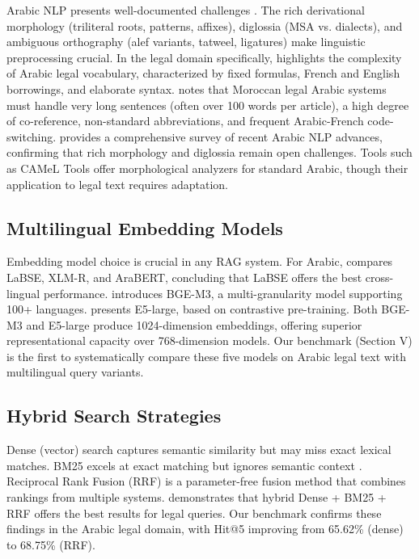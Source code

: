 Arabic NLP presents well-documented challenges \cite{habash2010arabic}.
The rich derivational morphology (triliteral roots, patterns, affixes),
diglossia (MSA vs. dialects), and ambiguous orthography (alef variants,
tatweel, ligatures) make linguistic preprocessing crucial. In the legal
domain specifically, \cite{zaghouani2021arabic} highlights the complexity
of Arabic legal vocabulary, characterized by fixed formulas, French and
English borrowings, and elaborate syntax. \cite{benali2025moroccan} notes
that Moroccan legal Arabic systems must handle very long sentences (often
over 100 words per article), a high degree of co-reference, non-standard
abbreviations, and frequent Arabic-French code-switching.
\cite{nassif2024arabic} provides a comprehensive survey of recent Arabic
NLP advances, confirming that rich morphology and diglossia remain open
challenges. Tools such as CAMeL Tools \cite{obaraj2021cameltools} offer
morphological analyzers for standard Arabic, though their application to
legal text requires adaptation.

\subsection{Multilingual Embedding Models}

Embedding model choice is crucial in any RAG system. For Arabic,
\cite{ali2022arabic} compares LaBSE, XLM-R, and AraBERT, concluding that
LaBSE offers the best cross-lingual performance. \cite{wang2023bge}
introduces BGE-M3, a multi-granularity model supporting 100+ languages.
\cite{liang2023multilingual} presents E5-large, based on contrastive
pre-training. Both BGE-M3 and E5-large produce 1024-dimension embeddings,
offering superior representational capacity over 768-dimension models.
Our benchmark (Section V) is the first to systematically compare these five
models on Arabic legal text with multilingual query variants.

\subsection{Hybrid Search Strategies}

Dense (vector) search captures semantic similarity but may miss exact lexical
matches. BM25 excels at exact matching but ignores semantic context
\cite{robertson2009bm25}. Reciprocal Rank Fusion (RRF) \cite{cormack2009reciprocal}
is a parameter-free fusion method that combines rankings from multiple
systems. \cite{shao2023hybrid} demonstrates that hybrid Dense + BM25 + RRF
offers the best results for legal queries. Our benchmark confirms these
findings in the Arabic legal domain, with Hit@5 improving from 65.62\%
(dense) to 68.75\% (RRF).


